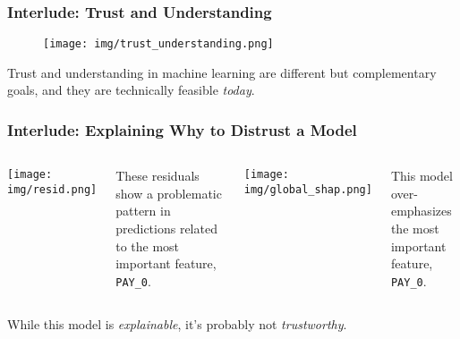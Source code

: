 \documentclass[11pt,
               aspectratio=169,
               hyperref={colorlinks}
               ]{beamer}
\begin{document}
			\begin{frame}[t]

  				\frametitle{Interlude: Trust and Understanding}
          
  				\begin{figure}[htb]
    					\begin{center}
      						\texttt{[image: img/trust\_understanding.png]}
    					\end{center}
  				\end{figure}
  
  				\vspace{-5pt}
  				\scriptsize{Trust and understanding in machine learning are different but complementary goals, and they are technically feasible \textit{today}}.
    
		  \end{frame}
		
		  \begin{frame}
		
				\frametitle{Interlude: Explaining Why to Distrust a Model}		
			

				\begin{columns}
	
					\centering
					\texttt{[image: img/resid.png]}
					
					\tiny{These residuals show a problematic pattern in predictions related to the most important feature, \texttt{PAY\_0}.}
				
					
					\centering
					\texttt{[image: img/global\_shap.png]}
					
					\tiny{This model over-emphasizes the most important feature, \texttt{PAY\_0}.}
				
				\end{columns}
			
				\vspace{10pt}
			
				\centering
				\footnotesize{While this model is \textit{explainable}, it's probably not \textit{trustworthy}.}
			
			\end{frame}
		
\end{document}

